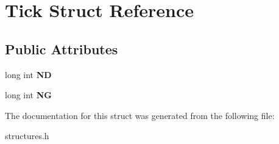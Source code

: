 \hypertarget{struct_tick}{}\section{Tick Struct Reference}
\label{struct_tick}
\subsection*{Public Attributes}
\begin{DoxyCompactItemize}
\item 
long int {\bfseries ND}\hypertarget{struct_tick_a788ee9eb9f9b0d6f234cb86f8fa100dd}{}\label{struct_tick_a788ee9eb9f9b0d6f234cb86f8fa100dd}

\item 
long int {\bfseries NG}\hypertarget{struct_tick_a60a0aa37b32f1f280febe76bd67081bf}{}\label{struct_tick_a60a0aa37b32f1f280febe76bd67081bf}

\end{DoxyCompactItemize}


The documentation for this struct was generated from the following file\+:\begin{DoxyCompactItemize}
\item 
structures.\+h\end{DoxyCompactItemize}
